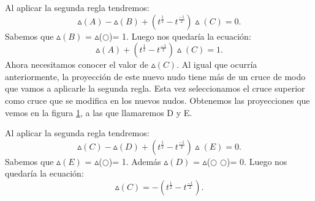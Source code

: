 \documentclass[14pt]{extarticle}
\begin{document}
Al aplicar la segunda regla tendremos:\\
\begin{equation}
 \vartriangle(A) - \vartriangle(B) +  (t^{\frac{1}{2}} - t^{\frac{-1}{2}}) \vartriangle(C)  = 0.
 \end{equation}
 Sabemos que $\vartriangle(B)$ = $\vartriangle$($\bigcirc$)= 1. Luego nos quedaría la ecuación:
\begin{equation}
\vartriangle(A) +  (t^{\frac{1}{2}} - t^{\frac{-1}{2}}) \vartriangle(C)  = 1.
\end{equation}
Ahora necesitamos conocer el valor de $\vartriangle(C)$. Al igual que ocurría anteriormente, la proyección de este nuevo nudo tiene más de un cruce de modo que vamos a aplicarle la segunda regla. Esta vez seleccionamos el cruce superior como cruce que se modifica en los nuevos nudos. Obtenemos las proyecciones que vemos en la figura \ref{alex3}, a las que llamaremos D y E. 
   \begin{figure}[h!]
   	\centering
   	\caption{}
   	\label{alex3} 
   \end{figure}

Al aplicar la segunda regla tendremos:\\
\begin{equation}
\vartriangle(C) - \vartriangle(D) +  (t^{\frac{1}{2}} - t^{\frac{-1}{2}}) \vartriangle(E)  = 0.
\end{equation}
 Sabemos que $\vartriangle(E)$ = $\vartriangle$($\bigcirc$)= 1. Además $\vartriangle(D)$ = $\vartriangle$($\bigcirc$ $\bigcirc$)= 0. Luego nos quedaría la ecuación:
 \begin{equation}
 \vartriangle(C) = -  (t^{\frac{1}{2}} - t^{\frac{-1}{2}}).
 \end{equation}
\end{document}
